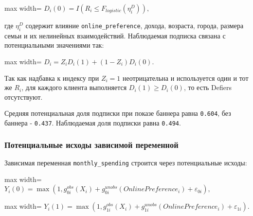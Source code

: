 \documentclass[11pt]{article}
\begin{document}
\begin{center}
\begin{adjustbox}{max width=\linewidth}
\(\displaystyle D_i(0) = I\left(R_i \leq F_{logistic}(\eta_i^D)\right),\)
\end{adjustbox}
\end{center}

где \(\eta_i^D\) содержит влияние \texttt{online\_preference}, дохода,
возраста, города, размера семьи и их нелинейных взаимодействий.
Наблюдаемая подписка связана с потенциальными значениями так:

\begin{center}
\begin{adjustbox}{max width=\linewidth}
\(\displaystyle D_i = Z_iD_i(1) + (1-Z_i)D_i(0).\)
\end{adjustbox}
\end{center}

Так как надбавка к индексу при \(Z_i=1\) неотрицательна и используется
один и тот же \(R_i\), для каждого клиента выполняется
\(D_i(1) \geq D_i(0)\), то есть Defiers отсутствуют.

Средняя потенциальная доля подписки при показе баннера равна
\texttt{0.604}, без баннера - \texttt{0.437}. Наблюдаемая доля подписки
равна \texttt{0.494}.

\subsubsection{Потенциальные исходы зависимой
переменной}\label{ux43fux43eux442ux435ux43dux446ux438ux430ux43bux44cux43dux44bux435-ux438ux441ux445ux43eux434ux44b-ux437ux430ux432ux438ux441ux438ux43cux43eux439-ux43fux435ux440ux435ux43cux435ux43dux43dux43eux439}

Зависимая переменная \texttt{monthly\_spending} строится через
потенциальные исходы:

\begin{center}
\begin{adjustbox}{max width=\linewidth}
\(\displaystyle Y_i(0) = \max\left(1, g_{0i}^{obs}(X_i) + g_{0i}^{unobs}(OnlinePreference_i) + \varepsilon_{0i}\right),\)
\end{adjustbox}
\end{center}

\begin{center}
\begin{adjustbox}{max width=\linewidth}
\(\displaystyle Y_i(1) = \max\left(1, g_{1i}^{obs}(X_i) + g_{1i}^{unobs}(OnlinePreference_i) + \varepsilon_{1i}\right).\)
\end{adjustbox}
\end{center}
\end{document}
